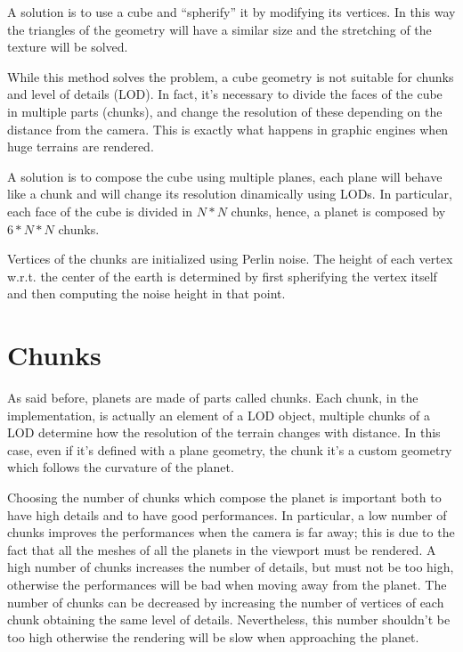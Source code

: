 \documentclass[paper=a4, fontsize=11pt]{scrartcl} %
\numberwithin{equation}{section} %
\numberwithin{figure}{section} %
\numberwithin{table}{section} %
\theoremstyle{definition}
\begin{document}
A solution is to use a cube and ``spherify'' it by modifying its vertices.
In this way the triangles of the geometry will have a similar size and the
stretching of the texture will be solved.

While this method solves the problem, a cube geometry is not suitable for chunks
and level of details (LOD). In fact, it's
necessary to divide the faces of the cube in multiple parts (chunks),
and change the resolution of these depending on the distance from the camera.
This is exactly what happens in graphic engines when huge terrains are
rendered.

A solution is to compose the cube using multiple planes, each plane will
behave like a chunk and will change its resolution dinamically using LODs.
In particular, each face of the cube is divided in $N*N$ chunks, hence, a
planet is composed by $6*N*N$ chunks.

Vertices of the chunks are initialized using Perlin noise. The height of each
vertex w.r.t. the center of the earth is determined by first spherifying the
vertex itself and then computing the noise height in that point.


\section{Chunks}

As said before, planets are made of parts called chunks. Each chunk, in the
implementation, is actually an element of a LOD object, multiple chunks of a
LOD determine how the resolution of the terrain changes with distance.
In this case, even if it's defined with a plane geometry, the chunk it's
a custom geometry which follows the curvature of the planet.

Choosing the number of chunks which compose the planet is important both to
have high details and to have good performances. In particular, a low number
of chunks improves the performances when the camera is far away; this is due
to the fact that all the meshes of all the planets in the viewport must be
rendered. A high number of chunks increases the number of details, but
must not be too high, otherwise the performances will be bad when moving away
from the planet. The number of chunks can be decreased by increasing the
number of vertices of each chunk obtaining the same level of details.
Nevertheless, this number shouldn't be
too high otherwise the rendering will be slow when approaching the planet. 
\end{document}
